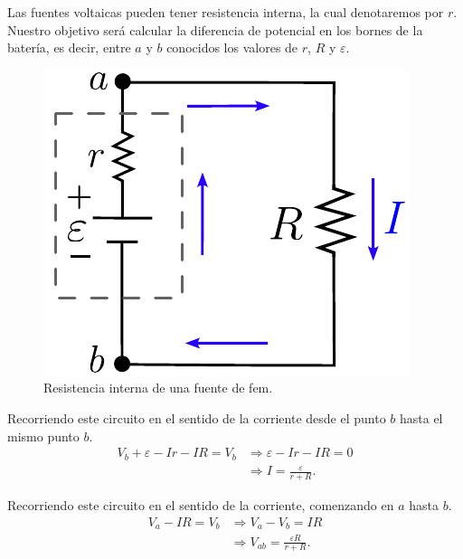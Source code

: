 \begin{ejemplo}

Las fuentes voltaicas pueden tener resistencia interna, la cual denotaremos por $r$. Nuestro objetivo será calcular la diferencia de potencial en los bornes de la batería, es decir, entre $a$ y $b$ conocidos los valores de $r$, $R$ y $\varepsilon$.

\begin{figure}[H]
    \centering
    \includegraphics[scale = 0.8]{Figuras/Ej-1-Kirchoff.pdf}
    \caption{Resistencia interna de una fuente de fem.}
    \label{fig:resistencia-fem}
\end{figure}

Recorriendo este circuito en el sentido de la corriente desde el punto $b$ hasta el mismo punto $b$.
\begin{align*}
  V_b + \varepsilon - Ir - IR = V_b &\Rightarrow  \varepsilon - Ir - IR = 0 \\
&\Rightarrow I = \frac{\varepsilon}{r+R}.  
\end{align*}

Recorriendo este circuito en el sentido de la corriente, comenzando en $a$ hasta $b$.
\begin{align*}
  V_a - IR = V_b &\Rightarrow  V_a - V_b = IR \\
&\Rightarrow  V_{ab} = \frac{\varepsilon R}{r + R}.  
\end{align*}

\end{ejemplo}

